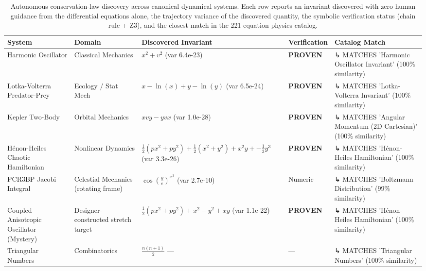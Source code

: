 \begin{table}[htbp]
\centering
\caption{Autonomous conservation-law discovery across canonical dynamical systems. Each row reports an invariant discovered with zero human guidance from the differential equations alone, the trajectory variance of the discovered quantity, the symbolic verification status (chain rule + Z3), and the closest match in the 221-equation physics catalog.}
\label{tab:ramanujan_showcase}
\begin{tabular}{lllll}
\toprule
System & Domain & Discovered Invariant & Verification & Catalog Match \\
\midrule
Harmonic Oscillator & Classical Mechanics & $x^{2} + v^{2}$ (var 6.4e-23) & \textbf{PROVEN} & ↳ MATCHES 'Harmonic Oscillator Invariant' (100\% similarity) \\
Lotka-Volterra Predator-Prey & Ecology / Stat Mech & $x - \ln\left(x\right) + y - \ln\left(y\right)$ (var 6.5e-24) & \textbf{PROVEN} & ↳ MATCHES 'Lotka-Volterra Invariant' (100\% similarity) \\
Kepler Two-Body & Orbital Mechanics & $x vy - y vx$ (var 1.0e-28) & \textbf{PROVEN} & ↳ MATCHES 'Angular Momentum (2D Cartesian)' (100\% similarity) \\
Hénon-Heiles Chaotic Hamiltonian & Nonlinear Dynamics & $\frac{1}{2} \left(px^{2} + py^{2}\right) + \frac{1}{2} \left(x^{2} + y^{2}\right) + x^{2} y + -\frac{1}{3} y^{3}$ (var 3.3e-26) & \textbf{PROVEN} & ↳ MATCHES 'Hénon-Heiles Hamiltonian' (100\% similarity) \\
PCR3BP Jacobi Integral & Celestial Mechanics (rotating frame) & $\cos\left(\frac{y}{e}\right)^{x^{3}}$ (var 2.7e-10) & Numeric & ↳ MATCHES 'Boltzmann Distribution' (99\% similarity) \\
Coupled Anisotropic Oscillator (Mystery) & Designer-constructed stretch target & $\frac{1}{2} \left(px^{2} + py^{2}\right) + x^{2} + y^{2} + x y$ (var 1.1e-22) & \textbf{PROVEN} & ↳ MATCHES 'Hénon-Heiles Hamiltonian' (100\% similarity) \\
Triangular Numbers & Combinatorics & $\frac{n \left(n + 1\right)}{2}$ — & — & ↳ MATCHES 'Triangular Numbers' (100\% similarity) \\
\bottomrule
\end{tabular}
\end{table}
